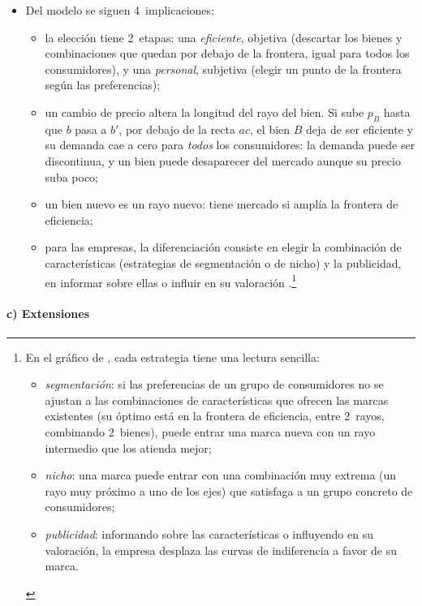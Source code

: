 \documentclass[11pt]{article}
\begin{document}
\begin{itemize}
\item Del modelo se siguen 4~implicaciones:
\begin{itemize}
\item la elección tiene 2~etapas: una \emph{eficiente}, objetiva (descartar los bienes y combinaciones que quedan por debajo de la frontera, igual para todos los consumidores), y una \emph{personal}, subjetiva (elegir un punto de la frontera según las preferencias);
\item un cambio de precio altera la longitud del rayo del bien. Si sube $p_B$ hasta que $b$ pasa a $b'$, por debajo de la recta $ac$, el bien $B$ deja de ser eficiente y su demanda cae a cero para \emph{todos} los consumidores: la demanda puede ser discontinua, y un bien puede desaparecer del mercado aunque su precio suba poco;
\item un bien nuevo es un rayo nuevo: tiene mercado si amplía la frontera de eficiencia;
\item para las empresas, la diferenciación consiste en elegir la combinación de características (estrategias de segmentación o de nicho) y la publicidad, en informar sobre ellas o influir en su valoración .\footnote{En el gráfico de , cada estrategia tiene una lectura sencilla:
  \begin{itemize}
  \item \emph{segmentación}: si las preferencias de un grupo de consumidores no se ajustan a las combinaciones de características que ofrecen las marcas existentes (su óptimo está en la frontera de eficiencia, entre 2~rayos, combinando 2~bienes), puede entrar una marca nueva con un rayo intermedio que los atienda mejor;
  \item \emph{nicho}: una marca puede entrar con una combinación muy extrema (un rayo muy próximo a uno de los ejes) que satisfaga a un grupo concreto de consumidores;
  \item \emph{publicidad}: informando sobre las características o influyendo en su valoración, la empresa desplaza las curvas de indiferencia a favor de su marca.
  \end{itemize}}
\end{itemize}
\end{itemize}

\paragraph{c) Extensiones}
\end{document}

